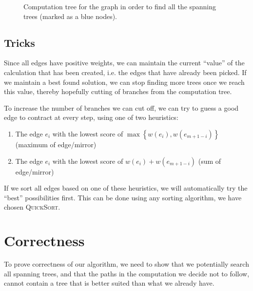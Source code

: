 \begin{figure}[H]
{}
\caption{Computation tree for the graph  in order to find all the spanning trees (marked as a blue nodes).}
\label{fig:comptree}
\end{figure}


\subsection{Tricks}
Since all edges have positive weights, we can maintain the current ``value'' of the calculation that has been created, i.e. the edges that have already been picked. If we maintain a best found solution, we can stop finding more trees once we reach this value, thereby hopefully cutting of branches from the computation tree.

To increase the number of branches we can cut off, we can try to guess a good edge to contract at every step, using one of two heuristics:

\begin{enumerate}
\item The edge $e_i$ with the lowest score of $\max\left\{w(e_i),w(e_{m+1-i})\right\}$ (maximum of edge/mirror)

\item The edge $e_i$ with the lowest score of $w(e_i)+w(e_{m+1-i})$ (sum of edge/mirror)
\end{enumerate}

If we sort all edges based on one of these heuristics, we will automatically try the ``best'' possibilities first. This can be done using any sorting algorithm, we have chosen \textsc{QuickSort}.

\section{Correctness}
To prove correctness of our algorithm, we need to show that we potentially search all spanning trees, and that the paths in the computation we decide not to follow, cannot contain a tree that is better suited than what we already have.


